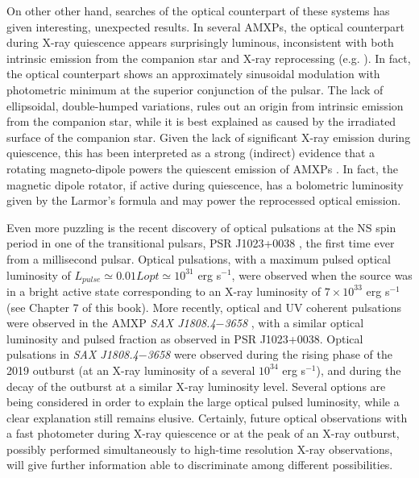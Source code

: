 \documentclass[graybox]{svmult}
\def \saxj{{\em SAX J1808.4$-$3658\xspace}}
\begin{document}
On other other hand, searches of the optical counterpart of these systems has given interesting, unexpected results. In several AMXPs, the optical counterpart during X-ray quiescence appears surprisingly luminous, inconsistent with both intrinsic emission from the companion star and X-ray reprocessing (e.g. \cite{Homer2001,DAvanzo2009,DAvanzo2011}). In fact, the optical counterpart shows an approximately sinusoidal modulation with photometric minimum at the superior conjunction of the pulsar. The lack of ellipsoidal, double-humped variations, rules out an origin from intrinsic emission from the companion star, while it is best explained as caused by the irradiated surface of the companion star. Given the lack of significant X-ray emission during quiescence, this has been interpreted as a strong (indirect) evidence that a rotating magneto-dipole powers the quiescent emission of AMXPs \cite{Burderi2003,Campana2004}. In fact, the magnetic dipole rotator, if active during quiescence, has a bolometric luminosity given by the Larmor's formula and may power the reprocessed optical emission. 

Even more puzzling is the recent discovery of optical pulsations at the NS spin period in one of the transitional pulsars, PSR J1023+0038 \cite{Ambrosino2017,Papitto2019}, the first time ever from a millisecond pulsar. Optical pulsations, with a maximum pulsed optical luminosity of $L_{pulse} \simeq 0.01 L{opt} \simeq 10^{31}$ erg s$^{-1}$, were observed when the source was in a bright active state corresponding to an X-ray luminosity of $7\times 10^{33}$ erg s$^{-1}$ (see Chapter 7 of this book). More recently, optical and UV coherent pulsations were observed in the AMXP \saxj{} \cite{Ambrosino2020}, with a similar optical luminosity and pulsed fraction as observed in PSR J1023+0038. Optical pulsations in \saxj{} were observed during the rising phase of the 2019 outburst (at an X-ray luminosity of a several $10^{34}$ erg s$^{-1}$), and during the decay of the outburst at a similar X-ray luminosity level. Several options are being considered in order to explain the large optical pulsed luminosity, while a clear explanation still remains elusive. Certainly, future optical observations with a fast photometer during X-ray quiescence or at the peak of an X-ray outburst, possibly performed simultaneously to high-time resolution X-ray observations, will give further information able to discriminate among different possibilities.
\end{document}
